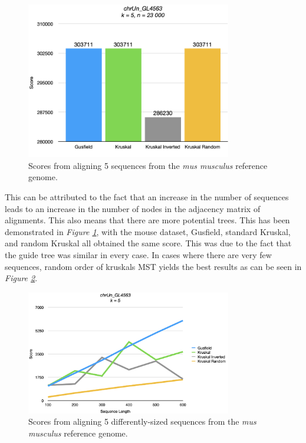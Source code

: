 \documentclass[twoside,openright,titlepage,numbers=noenddot,headinclude,%
                footinclude=true,cleardoublepage=empty,abstractoff, %
                BCOR=5mm,paper=a4,fontsize=11pt,%
                ngerman,american,%
                ]{scrreprt}
\begin{document}
\begin{figure}[H]
\includegraphics[width=0.8\textwidth]{report/chart-5.png}
\centering
\caption{Scores from aligning 5 sequences from the \textit{mus musculus} reference genome.}
\label{fig:chart-5}
\end{figure}

This can be attributed to the fact that an increase in the number of sequences leads to an increase in the number of nodes in the adjacency matrix of alignments. This also means that there are more potential trees. This has been demonstrated in \textit{Figure \ref{fig:chart-5}}, with the mouse dataset, Gusfield, standard Kruskal, and random Kruskal all obtained the same score. This was due to the fact that the guide tree was similar in every case. In cases where there are very few sequences, random order of kruskals MST yields the best results as can be seen in \textit{Figure \ref{fig:chart-1}}.


\begin{figure}[H]
\includegraphics[width=0.8\textwidth]{report/chart-1.png}
\centering
\caption{Scores from aligning 5 differently-sized sequences from the \textit{mus musculus} reference genome.}
\label{fig:chart-1}
\end{figure}
\end{document}
